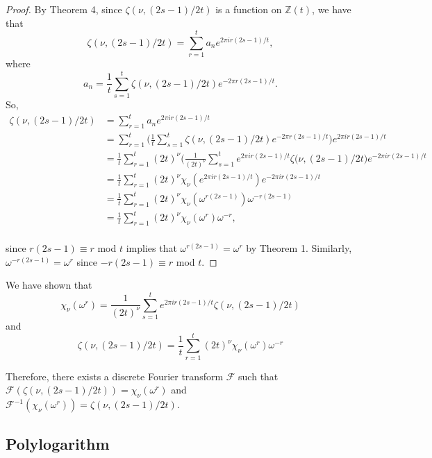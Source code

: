 \documentclass[../article.tex]{subfiles}
\begin{document}
\begin{proof}
By Theorem 4, since $\zeta(\nu, (2s-1)/2t)$ is a function on $\mathbb{Z}(t)$, we have that
\begin{equation}
\zeta(\nu, (2s-1)/2t) = \sum_{r=1}^{t} a_{n} e^{2 \pi i r(2s-1)/t},
\end{equation}
where
\begin{equation}
a_n = \frac{1}{t} \sum_{s=1}^{t} \zeta(\nu, (2s-1)/2t) e^{-2 \pi r(2s-1)/t}.
\end{equation}
So,
\begin{equation}
\begin{split}
\zeta(\nu, (2s-1)/2t) &= \sum_{r=1}^{t} a_{n} e^{2 \pi i r(2s-1)/t} \\
&= \sum_{r=1}^{t} \Bigg(\frac{1}{t} \sum_{s=1}^{t} \zeta(\nu, (2s-1)/2t) e^{-2 \pi r(2s-1)/t}\Bigg)e^{2 \pi i r(2s-1)/t} \\
&= \frac{1}{t} \sum_{r=1}^{t} (2t)^{\nu} \Bigg(\frac{1}{(2t)^{\nu}} \sum_{s=1}^{t} e^{2 \pi ir(2s-1)/t} \zeta(\nu, (2s-1)/2t \Bigg) e^{-2 \pi ir(2s-1)/t} \\
&= \frac{1}{t} \sum_{r=1}^{t} (2t)^{\nu} \chi_{\nu}(e^{2 \pi ir(2s-1)/t})e^{-2 \pi ir(2s-1)/t} \\
&= \frac{1}{t} \sum_{r=1}^{t} (2t)^{\nu} \chi_{\nu}(\omega^{r(2s-1)})\omega^{-r(2s-1)} \\
&= \frac{1}{t} \sum_{r=1}^{t} (2t)^{\nu} \chi_{\nu}(\omega^{r})\omega^{-r}, \\
\end{split}
\end{equation}

since $r(2s-1) \equiv r$ mod $t$ implies that $\omega^{r(2s-1)} = \omega^{r}$ by Theorem 1. Similarly, $\omega^{-r(2s-1)} = \omega^{r}$ since $-r(2s-1) \equiv r$ mod $t$.
\end{proof}

We have shown that
\begin{equation}
\chi_{\nu}(\omega^r) = \frac{1}{(2t)^{\nu}} \sum_{s=1}^{t} e^{2 \pi ir(2s-1)/t} \zeta(\nu, (2s-1)/2t)
\end{equation}
and
\begin{equation}
\zeta(\nu, (2s-1)/2t) = \frac{1}{t} \sum_{r=1}^{t} (2t)^{\nu} \chi_{\nu}(\omega^{r})\omega^{-r}
\end{equation}

Therefore, there exists a discrete Fourier transform $\mathcal{F}$ such that $\mathcal{F}(\zeta(\nu, (2s-1)/2t)) = \chi_{\nu}(\omega^r)$ and $\mathcal{F}^{-1}(\chi_{\nu}(\omega^r)) = \zeta(\nu, (2s-1)/2t)$.

\subsection*{Polylogarithm}
\end{document}
